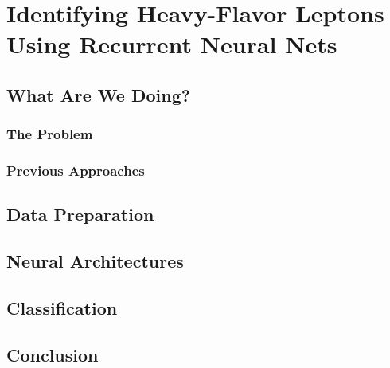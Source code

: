 \chapter{Identifying Heavy-Flavor Leptons Using Recurrent Neural Nets}

\section{What Are We Doing?}

\subsection{The Problem}

\subsection{Previous Approaches}

\section{Data Preparation}

\section{Neural Architectures}

\section{Classification}

\section{Conclusion}